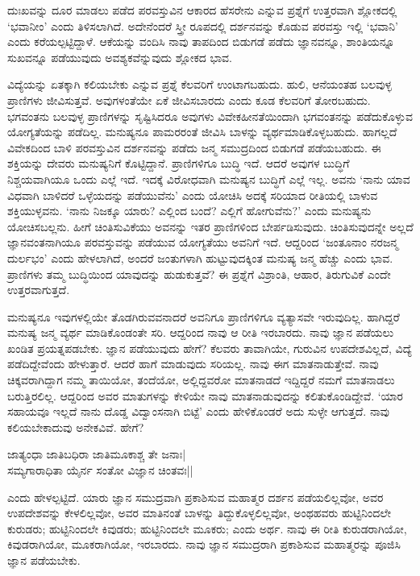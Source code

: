 ದುಃಖವನ್ನು ದೂರ ಮಾಡಲು ಪಡೆದ ಪರವಸ್ತುವಿನ ಆಕಾರದ ಹೆಸರೇನು ಎನ್ನುವ ಪ್ರಶ್ನೆಗೆ ಉತ್ತರವಾಗಿ ಶ್ಲೋಕದಲ್ಲಿ 
`ಭವಾನೀಂ' ಎಂದು ತಿಳಿಸಲಾಗಿದೆ. ಅದೇನೆಂದರೆ ಸ್ತ್ರೀ ರೂಪದಲ್ಲಿ ದರ್ಶನವನ್ನು ಕೊಡುವ ಪರವಸ್ತು ಇಲ್ಲಿ `ಭವಾನಿ' ಎಂದು 
ಕರೆಯಲ್ಪಟ್ಟಿದ್ದಾಳೆ. 
ಆಕೆಯನ್ನು ವಂದಿಸಿ ನಾವು ತಾಪದಿಂದ ಬಿಡುಗಡೆ ಪಡೆದು ಜ್ಞಾನವನ್ನೂ, ಶಾಂತಿಯನ್ನೂ ಸುಖವನ್ನೂ ಪಡೆಯುವುದು ಅವಶ್ಯಕವೆನ್ನುವುದು ಶ್ಲೋಕದ ಭಾವ.

ವಿದ್ಯೆಯನ್ನು ಏತಕ್ಕಾಗಿ ಕಲಿಯಬೇಕು ಎನ್ನುವ ಪ್ರಶ್ನೆ  ಕೆಲವರಿಗೆ ಉಂಟಾಗಬಹುದು. ಹುಲಿ, ಆನೆಯಂತಹ ಬಲವುಳ್ಳ ಪ್ರಾಣಿಗಳು ಜೀವಿಸುತ್ತವೆ. ಅವುಗಳಂತೆಯೇ 
ಏಕೆ ಜೀವಿಸಬಾರದು ಎಂದು ಕೂಡ ಕೆಲವರಿಗೆ ತೋರಬಹುದು. ಭಗವಂತನು ಬಲವುಳ್ಳ ಪ್ರಾಣಿಗಳನ್ನು ಸೃಷ್ಟಿಸಿದರೂ ಅವುಗಳು ವಿವೇಕಹೀನತೆಯಿಂದಾಗಿ 
ಭಗವಂತನನ್ನು ಪಡೆದುಕೊಳ್ಳುವ ಯೋಗ್ಯತೆಯನ್ನು ಪಡೆದಿಲ್ಲ. ಮನುಷ್ಯನೂ ಪಾಮರರಂತೆ ಜೀವಿಸಿ ಬಾಳನ್ನು ವ್ಯರ್ಥಮಾಡಿಕೊಳ್ಳಬಹುದು. 
ಹಾಗಲ್ಲದೆ ವಿವೇಕದಿಂದ ಬಾಳಿ ಪರವಸ್ತುವಿನ ದರ್ಶನವನ್ನು ಪಡೆದು ಜನ್ಮ ಸಮುದ್ರದಿಂದ ಬಿಡುಗಡೆ ಪಡೆಯಬಹುದು. ಈ ಶಕ್ತಿಯನ್ನು ದೇವರು 
ಮನುಷ್ಯನಿಗೆ ಕೊಟ್ಟಿದ್ದಾನೆ. ಪ್ರಾಣಿಗಳಿಗೂ ಬುದ್ಧಿ ಇದೆ. ಆದರೆ ಅವುಗಳ ಬುದ್ಧಿಗೆ ನಿಶ್ಚಯವಾಗಿಯೂ ಒಂದು ಎಲ್ಲೆ ಇದೆ. ಇದಕ್ಕೆ ವಿರೋಧವಾಗಿ 
ಮನುಷ್ಯನ ಬುದ್ಧಿಗೆ ಎಲ್ಲೆ ಇಲ್ಲ. ಅವನು `ನಾನು ಯಾವ ವಿಧವಾಗಿ ಬಾಳಿದರೆ ಒಳ್ಳೆಯದನ್ನು ಪಡೆಯುವೆನು' ಎಂದು ಯೋಚಿಸಿ ಅದಕ್ಕೆ ಸರಿಯಾದ 
ರೀತಿಯಲ್ಲಿ ಬಾಳುವ ಶಕ್ತಿಯುಳ್ಳವನು. `ನಾನು ನಿಜಕ್ಕೂ ಯಾರು? ಎಲ್ಲಿಂದ ಬಂದೆ? ಎಲ್ಲಿಗೆ ಹೋಗುವೆನು?' ಎಂದು ಮನುಷ್ಯನು ಯೋಚಿಸಬಲ್ಲನು. 
ಹೀಗೆ ಚಿಂತಿಸುವಿಕೆಯು ಅವನನ್ನು ಇತರ ಪ್ರಾಣಿಗಳಿಂದ ಬೇರ್ಪಡಿಸುವುದು. ಚಿಂತಿಸುವುದನ್ನೇ ಅಲ್ಲದೆ ಜ್ಞಾನವಂತನಾಗಿಯೂ ಪರವಸ್ತುವನ್ನು ಪಡೆಯುವ 
ಯೋಗ್ಯತೆಯು ಅವನಿಗೆ ಇದೆ. ಆದ್ದರಿಂದ `ಜಂತೂನಾಂ ನರಜನ್ಮ ದುರ್ಲಭಂ' ಎಂದು ಹೇಳಲಾಗಿದೆ, ಅಂದರೆ ಜಂತುಗಳಾಗಿ ಹುಟ್ಟುವುದಕ್ಕಿಂತ ಮನುಷ್ಯ 
ಜನ್ಮ ಹೆಚ್ಚು ಎಂದು ಭಾವ. ಪ್ರಾಣಿಗಳು ತಮ್ಮ ಬುದ್ಧಿಯಿಂದ ಯಾವುದನ್ನು ಹುಡುಕುತ್ತವೆ? ಈ ಪ್ರಶ್ನೆಗೆ ವಿಶ್ರಾಂತಿ, ಆಹಾರ, ತಿರುಗುವಿಕೆ ಎಂದೇ ಉತ್ತರವಾಗುತ್ತದೆ.

ಮನುಷ್ಯನೂ ಇವುಗಳಲ್ಲಿಯೇ ತೊಡಗಿರುವವನಾದರೆ ಅವನಿಗೂ ಪ್ರಾಣಿಗಳಿಗೂ ವ್ಯತ್ಯಾಸವೇ ಇರುವುದಿಲ್ಲ. ಹಾಗಿದ್ದರೆ ಮನುಷ್ಯ ಜನ್ಮ ವ್ಯರ್ಥ 
ಮಾಡಿಕೊಂಡಂತೇ ಸರಿ. ಆದ್ದರಿಂದ ನಾವು ಆ ರೀತಿ ಇರಬಾರದು. ನಾವು ಜ್ಞಾನ ಪಡೆಯಲು ಖಂಡಿತ ಪ್ರಯತ್ನಪಡಬೇಕು. ಜ್ಞಾನ ಪಡೆಯುವುದು ಹೇಗೆ? ಕೆಲವರು 
ತಾವಾಗಿಯೇ, ಗುರುವಿನ ಉಪದೇಶವಿಲ್ಲದೆ, ವಿದ್ಯೆ  ಪಡೆದಿದ್ದೇವೆಂದು ಹೇಳುತ್ತಾರೆ. ಆದರೆ ಹಾಗೆ ಮಾಡುವುದು ಸರಿಯಲ್ಲ. ನಾವು ಈಗ ಮಾತನಾಡುತ್ತೇವೆ. ನಾವು 
ಚಿಕ್ಕವರಾಗಿದ್ದಾಗ ನಮ್ಮ ತಾಯಿಯೋ, ತಂದೆಯೋ, ಅಲ್ಲಿದ್ದವರೋ ಮಾತನಾಡದೆ ಇದ್ದಿದ್ದರೆ ನಮಗೆ ಮಾತನಾಡಲು ಬರುತ್ತಿರಲಿಲ್ಲ. ಆದ್ದರಿಂದ 
ಅವರ ಮಾತುಗಳನ್ನು ಕೇಳಿಯೇ ನಾವು ಮಾತನಾಡುವುದನ್ನು ಕಲಿತುಕೊಂಡಿದ್ದೇವೆ. `ಯಾರ ಸಹಾಯವೂ ಇಲ್ಲದೆ ನಾನು ದೊಡ್ಡ ವಿದ್ವಾಂಸನಾಗಿ ಬಿಟ್ಟೆ' ಎಂದು 
ಹೇಳಿಕೊಂಡರೆ ಅದು ಸುಳ್ಳೇ ಆಗುತ್ತದೆ. ನಾವು ಕಲಿಯಬೇಕಾದುವು ಅನೇಕವಿವೆ. ಹೇಗೆ?

\begin{shloka}
ಜಾತ್ಯಂಧಾ ಜಾತಿಬಧಿರಾ ಜಾತಿಮೂಕಾಶ್ಚ ತೇ ಜನಾಃ|\\
ಸಮ್ಯಗಾರಾಧಿತಾ ಯೈರ್ನ ಸಂತೋ ವಿಜ್ಞಾನ ಚಿಂತವಃ||
\end{shloka}

ಎಂದು ಹೇಳಲ್ಪಟ್ಟಿದೆ. ಯಾರು ಜ್ಞಾನ ಸಮುದ್ರವಾಗಿ ಪ್ರಕಾಶಿಸುವ ಮಹಾತ್ಮರ ದರ್ಶನ ಪಡೆಯಲಿಲ್ಲವೋ, ಅವರ ಉಪದೇಶವನ್ನು ಕೇಳಲಿಲ್ಲವೋ, 
ಅವರ ಮಾತಿನಂತೆ ಬಾಳನ್ನು ತಿದ್ದುಕೊಳ್ಳಲಿಲ್ಲವೋ, ಅಂಥಹವರು ಹುಟ್ಟಿನಿಂದಲೇ ಕುರುಡರು; ಹುಟ್ಟಿನಿಂದಲೇ ಕಿವುಡರು; ಹುಟ್ಟಿನಿಂದಲೇ 
ಮೂಕರು; ಎಂದು ಅರ್ಥ. ನಾವು ಈ ರೀತಿ ಕುರುಡರಾಗಿಯೋ, ಕಿವುಡರಾಗಿಯೋ, ಮೂಕರಾಗಿಯೋ, ಇರಬಾರದು. ನಾವು ಜ್ಞಾನ 
ಸಮುದ್ರರಾಗಿ ಪ್ರಕಾಶಿಸುವ ಮಹಾತ್ಮರನ್ನು ಪೂಜಿಸಿ ಜ್ಞಾನ ಪಡೆಯಬೇಕು.

